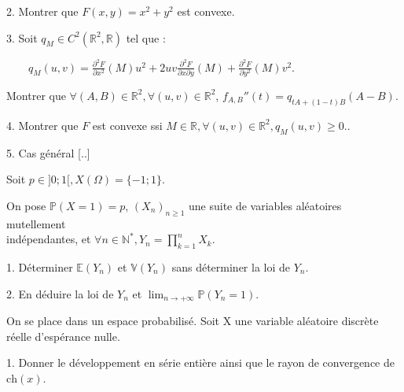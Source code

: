 \vspace{5pt}
2. Montrer que $F(x,y) = x^2 + y^2$ est convexe.

\vspace{5pt}
3. Soit $q_M \in C^2(\mathbb{R}^2, \mathbb{R})$ tel que :

\vspace{5pt}
$\qquad \displaystyle q_M(u, v)  = \frac {\partial^2 F} {\partial x^2} (M) u^2
            + 2uv \frac {\partial^2 F} {\partial x \partial y} (M)
            + \frac {\partial^2 F} {\partial y^2} (M) v^2$.

\vspace{5pt}
Montrer que $\forall (A,B) \in \mathbb{R}^2, \forall (u, v) \in \mathbb{R}^2$,
$f_{A,B}''(t) = q_{tA + (1-t)B}(A-B)$.

\vspace{5pt}
4. Montrer que $F$ est convexe ssi $M \in \mathbb{R}, \forall (u, v) \in \mathbb{R}^2, q_M(u, v) \geqslant 0.$.

\vspace{5pt}
5. Cas général [..]



\subetoiles



\noindent Soit $p \in \rbrack 0;1 \lbrack, X(\Omega) = \{ -1; 1\}$.

\vspace{5pt}
\noindent On pose $\mathbb{P}(X=1) = p$, $(X_n)_{n \geqslant 1}$ une suite de variables aléatoires mutellement \\
indépendantes, et $\displaystyle \forall n \in \mathbb{N}^*, Y_n = \prod_{k=1}^{n}X_k$.

\vspace{5pt}
1. Déterminer $\mathbb{E}(Y_n)$ et $\mathbb{V}(Y_n)$ sans déterminer la loi de $Y_n$.

\vspace{5pt}
2. En déduire la loi de $Y_n$ et $\displaystyle \lim_{n\to+\infty} \mathbb{P}(Y_n=1)$.



\subetoiles
\columnbreak



\noindent On se place dans un espace probabilisé. Soit X une variable aléatoire discrète réelle d'espérance nulle.

\vspace{5pt}
1. Donner le développement en série entière ainsi que le rayon de convergence de $\mathrm{ch}(x)$.

